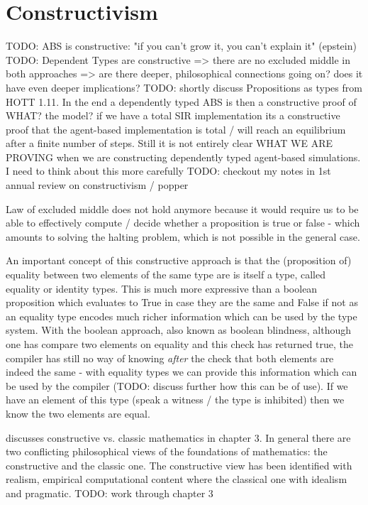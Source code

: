 \section{Constructivism}
TODO: ABS is constructive: "if you can't grow it, you can't explain it" (epstein)
TODO: Dependent Types are constructive
=> there are no excluded middle in both approaches
=> are there deeper, philosophical connections going on? does it have even deeper implications?
TODO: shortly discuss Propositions as types from HOTT 1.11. In the end a dependently typed ABS is then a constructive proof of WHAT? the model? if we have a total SIR implementation its a constructive proof that the agent-based implementation is total / will reach an equilibrium after a finite number of steps. Still it is not entirely clear WHAT WE ARE PROVING when we are constructing dependently typed agent-based simulations. I need to think about this more carefully
TODO: checkout my notes in 1st annual review on constructivism / popper 

Law of excluded middle does not hold anymore because it would require us to be able to effectively compute / decide whether a proposition is true or false - which amounts to solving the halting problem, which is not possible in the general case.

An important concept of this constructive approach is that the (proposition of) equality between two elements of the same type are is itself a type, called equality or identity types. This is much more expressive than a boolean proposition which evaluates to True in case they are the same and False if not as an equality type encodes much richer information which can be used by the type system. With the boolean approach, also known as boolean blindness, although one has compare two elements on equality and this check has returned true, the compiler has still no way of knowing \textit{after} the check that both elements are indeed the same - with equality types we can provide this information which can be used by the compiler (TODO: discuss further how this can be of use).
If we have an element of this type (speak a witness / the type is inhibited) then we know the two elements are equal.

\cite{thompson_type_1991} discusses constructive vs. classic mathematics in chapter 3. In general there are two conflicting philosophical views of the foundations of mathematics: the constructive and the classic one. The constructive view has been identified with realism, empirical computational content where the classical one with idealism and pragmatic. TODO: work through chapter 3

